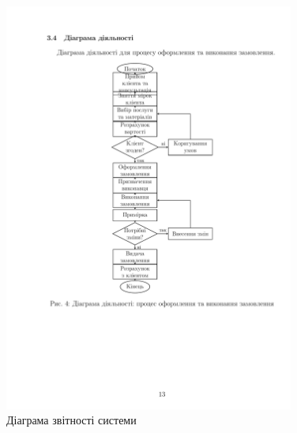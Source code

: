 \documentclass[14pt,a4paper]{extarticle}
\begin{document}
\begin{figure}[h!]
\centering
\includegraphics[width=0.85\textwidth]{diagrams/diagram-14.png}
\caption{Діаграма звітності системи}
\end{figure}
\end{document}
